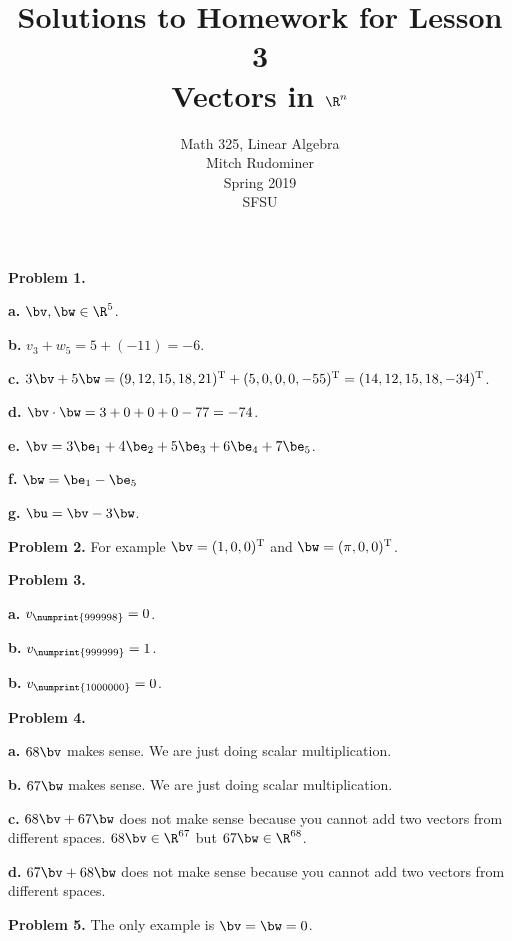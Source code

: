 \documentclass[oneside,12pt]{amsart}
\begin{document}
\title{Solutions to Homework for Lesson 3 \\ Vectors in $\R^n$}
\author{Math 325, Linear Algebra \\ Mitch Rudominer \\ Spring 2019 \\ SFSU }
\date{}

\maketitle


\textbf{Problem 1.}

\textbf{a.} $\bv, \bw \in \R^5$.

\textbf{b.} $v_3 + w_5 = 5 + (-11) = -6$.

\textbf{c.} $3 \bv + 5 \bw = (9, 12, 15, 18, 21)^{\text{T}} + (5, 0, 0, 0, -55)^{\text{T}} = (14, 12, 15, 18, -34)^{\text{T}}$.

\textbf{d.} $\bv \cdot \bw = 3 + 0 + 0 + 0 - 77 = -74$.


\textbf{e.} $\bv = 3\be_1 + 4\be_2 + 5\be_3 +6\be_4 + 7\be_5$.

\textbf{f.} $\bw = \be_1 - \be_5$

\textbf{g.} $\bu = \bv - 3\bw$.

\smallskip

\textbf{Problem 2.} For example $\bv = (1, 0, 0)^{\text{T}}$ and $\bw = (\pi, 0, 0)^{\text{T}}$.

\smallskip

\textbf{Problem 3.}

\textbf{a.} $v_{\numprint{999998}} = 0$.

\textbf{b.} $v_{\numprint{999999}} = 1$.

\textbf{b.} $v_{\numprint{1000000}} = 0$.

\smallskip

\textbf{Problem 4.}

\textbf{a.} $68 \bv$ makes sense. We are just doing scalar multiplication.

\textbf{b.} $67 \bw$ makes sense. We are just doing scalar multiplication.

\textbf{c.} $68 \bv + 67 \bw$ does not make sense because you cannot add
two vectors from different spaces. $68 \bv \in \R^{67}$ but
$67 \bw \in \R^{68}$.


\textbf{d.} $67 \bv + 68 \bw$ does not make sense because you cannot add two
vectors from different spaces.


\smallskip

\textbf{Problem 5.} The only example is $\bv = \bw = 0$.
\end{document}
